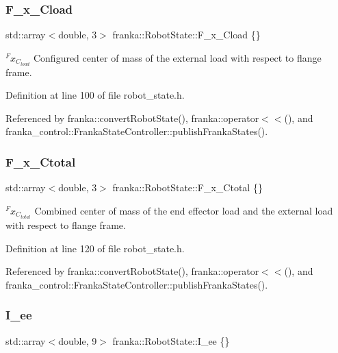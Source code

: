 \subsubsection{\texorpdfstring{F\+\_\+x\+\_\+\+Cload}{F\_x\_Cload}}
{\footnotesize\ttfamily std\+::array$<$double, 3$>$ franka\+::\+Robot\+State\+::\+F\+\_\+x\+\_\+\+Cload \{\}}

$^{F}x_{C_{load}}$ Configured center of mass of the external load with respect to flange frame. 

Definition at line 100 of file robot\+\_\+state.\+h.



Referenced by franka\+::convert\+Robot\+State(), franka\+::operator$<$$<$(), and franka\+\_\+control\+::\+Franka\+State\+Controller\+::publish\+Franka\+States().

\mbox{\label{structfranka_1_1RobotState_a72ee7362018e3c9e95e3c41e857bfd8d}} 
\subsubsection{\texorpdfstring{F\+\_\+x\+\_\+\+Ctotal}{F\_x\_Ctotal}}
{\footnotesize\ttfamily std\+::array$<$double, 3$>$ franka\+::\+Robot\+State\+::\+F\+\_\+x\+\_\+\+Ctotal \{\}}

$^{F}x_{C_{total}}$ Combined center of mass of the end effector load and the external load with respect to flange frame. 

Definition at line 120 of file robot\+\_\+state.\+h.



Referenced by franka\+::convert\+Robot\+State(), franka\+::operator$<$$<$(), and franka\+\_\+control\+::\+Franka\+State\+Controller\+::publish\+Franka\+States().

\mbox{\label{structfranka_1_1RobotState_a74cee1beb5d400694133deea2846e611}} 
\subsubsection{\texorpdfstring{I\+\_\+ee}{I\_ee}}
{\footnotesize\ttfamily std\+::array$<$double, 9$>$ franka\+::\+Robot\+State\+::\+I\+\_\+ee \{\}}

